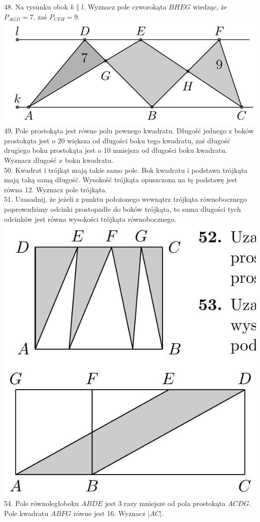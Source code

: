 \documentclass[10pt]{article}
\begin{document}
48. Na rysunku obok \(k \| l\). Wyznacz pole czworokąta \(B H E G\) wiedząc, że \(P_{A G D}=7\), zaś \(P_{C F H}=9\).\\
\includegraphics[max width=\textwidth, center]{2024_11_21_71f62bd117d375398909g-041}\\
49. Pole prostokąta jest równe polu pewnego kwadratu. Długość jednego z boków prostokąta jest o 20 większa od długości boku tego kwadratu, zaś długość drugiego boku prostokąta jest o 10 mniejsza od długości boku kwadratu. Wyznacz długość \(x\) boku kwadratu.\\
50. Kwadrat i trójkąt mają takie samo pole. Bok kwadratu i podstawa trójkąta mają taką samą długość. Wysokość trójkąta opuszczona na tę podstawę jest równa 12. Wyznacz pole trójkąta.\\
51. Uzasadnij, że jeżeli z punktu położonego wewnątrz trójkąta równobocznego poprowadzimy odcinki prostopadłe do boków trójkąta, to suma długości tych odcinków jest równa wysokości trójkąta równobocznego.\\
\includegraphics[max width=\textwidth, center]{2024_11_21_71f62bd117d375398909g-042}\\
54. Pole równoległoboku \(A B D E\) jest 3 razy mniejsze od pola prostokąta \(A C D G\). Pole kwadratu \(A B F G\) równe jest 16. Wyznacz \(|A C|\).
\end{document}
